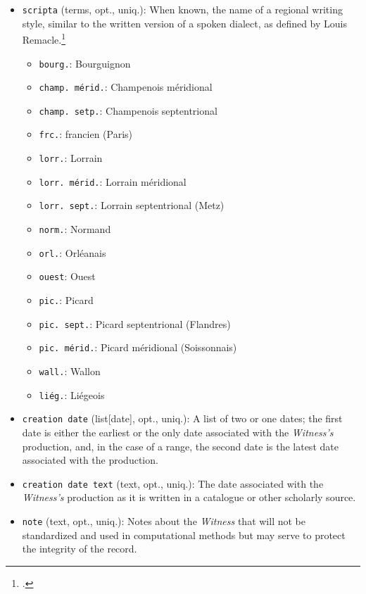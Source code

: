 \begin{itemize}
    \item \texttt{scripta} (terms, opt., uniq.): When known, the name of a regional writing style, similar to the written version of a spoken dialect, as defined by Louis Remacle.\footcite[``Je désigne la langue vulgaire écrite au moyen âge par le néologisme \textit{scripta}. L'expression `la scripta' est synonyme de l'allemand `die Schriftsprache.'''][24]{Remacle1948}
    \begin{multicols}{2}
        \begin{itemize}
            \item \texttt{bourg.}: Bourguignon
            \item \texttt{champ. mérid.}: Champenois méridional
            \item \texttt{champ. setp.}: Champenois septentrional
            \item \texttt{frc.}: francien (Paris)
            \item \texttt{lorr.}: Lorrain
            \item \texttt{lorr. mérid.}: Lorrain méridional
            \item \texttt{lorr. sept.}: Lorrain septentrional (Metz)
            \item \texttt{norm.}: Normand
            \item \texttt{orl.}: Orléanais
            \item \texttt{ouest}: Ouest
            \item \texttt{pic.}: Picard
            \item \texttt{pic. sept.}: Picard septentrional (Flandres)
            \item \texttt{pic. mérid.}: Picard méridional (Soissonnais)
            \item \texttt{wall.}: Wallon
            \item \texttt{liég.}: Liégeois
        \end{itemize}
    \end{multicols}
    \item \texttt{creation date} (list[date], opt., uniq.): A list of two or one dates; the first date is either the earliest or the only date associated with the \textit{Witness's} production, and, in the case of a range, the second date is the latest date associated with the production.
    \item \texttt{creation date text} (text, opt., uniq.): The date associated with the \textit{Witness's} production as it is written in a catalogue or other scholarly source.
    \item \texttt{note} (text, opt., uniq.): Notes about the \textit{Witness} that will not be standardized and used in computational methods but may serve to protect the integrity of the record.
\end{itemize}

